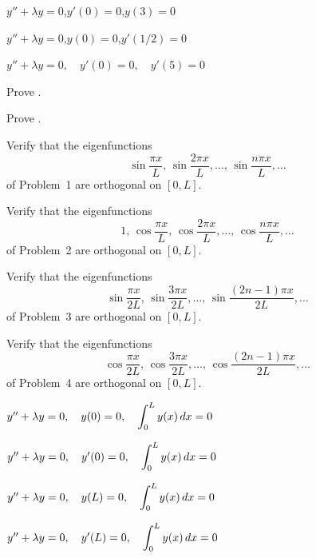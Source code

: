 \begin{exerciselist}
\item\label{exer:11.1.14}$y''+\lambda y=0$,\quad $y'(0)=0$,\quad $y(3)=0$

\item\label{exer:11.1.15}$y''+\lambda y=0$,\quad $y(0)=0$,\quad $y'(1/2)=0$

\item\label{exer:11.1.16}$y''+\lambda y=0,\quad y'(0)=0,\quad y'(5)=0$

\item\label{exer:11.1.17}Prove .

\item\label{exer:11.1.18}Prove .

\item\label{exer:11.1.19}Verify that the eigenfunctions
\[
\sin\frac{\pi x}{L},
\, \sin\frac{2\pi x}{L},\dots,
 \, \sin\frac{n\pi x}{L},\dots
\]
 of Problem~1 are orthogonal on $[0,L]$.

\item\label{exer:11.1.20}Verify  that the eigenfunctions
\[
1,\, \cos\frac{\pi x}{L},
\, \cos\frac{2\pi x}{L},\dots,
 \, \cos\frac{n\pi x}{L},\dots
\]
of Problem~2 are orthogonal on $[0,L]$.

\item\label{exer:11.1.21}Verify that  the eigenfunctions
\[
\sin\frac{\pi x}{2L},
\, \sin\frac{3\pi x}{2L},\dots,
 \, \sin\frac{(2n-1)\pi x}{2L},\dots
\]
of Problem~3 are orthogonal on $[0,L]$.

\item\label{exer:11.1.22}Verify  that the eigenfunctions
\[
\cos\frac{\pi x}{2L},
\, \cos\frac{3\pi x}{2L},\dots,
 \, \cos\frac{(2n-1)\pi x}{2L},\dots
\]
of Problem~4 are orthogonal on $[0,L]$.


\item\label{exer:11.1.23}$y''+\lambda y=0,\quad y(0)=0,\quad \displaystyle\int_0^Ly(x)\,dx=0$

\item\label{exer:11.1.24}$y''+\lambda y=0,\quad y'(0)=0,\quad \displaystyle\int_0^Ly(x)\,dx=0$

\item\label{exer:11.1.25}$y''+\lambda y=0,\quad y(L)=0,\quad \displaystyle\int_0^Ly(x)\,dx=0$

\item\label{exer:11.1.26}$y''+\lambda y=0,\quad y'(L)=0,\quad \displaystyle\int_0^Ly(x)\,dx=0$

\end{exerciselist}



